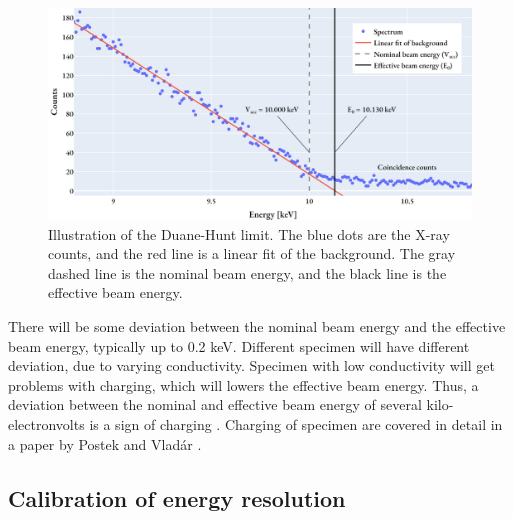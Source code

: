 \begin{figure}[ht]
    \centering
    \includegraphics[width=0.8\linewidth]{figures/Duane-Hunt.png}
    \caption{
        Illustration of the Duane-Hunt limit.
        The blue dots are the X-ray counts, and the red line is a linear fit of the background.
        The gray dashed line is the nominal beam energy, and the black line is the effective beam energy.
    }
    \label{fig:duanehunt}
\end{figure}


There will be some deviation between the nominal beam energy and the effective beam energy, typically up to 0.2 keV.
Different specimen will have different deviation, due to varying conductivity.
Specimen with low conductivity will get problems with charging, which will lowers the effective beam energy.
Thus, a deviation between the nominal and effective beam energy of several kilo-electronvolts is a sign of charging \cite{dtsaii_2_manipulating_spectra}.
Charging of specimen are covered in detail in a paper by Postek and Vladár \cite{postek_charging_2015}.






\subsection{Calibration of energy resolution}
\label{theory:qc:energyres}


